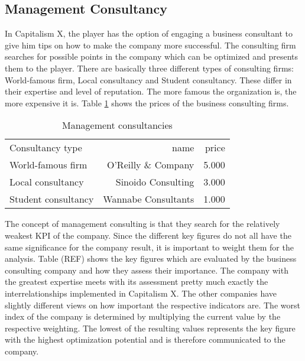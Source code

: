 \subsection{Management Consultancy} \label{management_consultancy_simulation}
In Capitalism X, the player has the option of engaging a business consultant to give him tips on how to make the company more successful. 
The consulting firm searches for possible points in the company which can be optimized and presents them to the player.
There are basically three different types of consulting firms: World-famous firm, Local consultancy and Student consultancy. These differ in their expertise and level of reputation. The more famous the organization is, the more expensive it is. Table \ref{mng_consultancy} shows the prices of the business consulting firms.

\begin{table}[ht]
\centering
\begin{tabular}{|l|r|r|}
\hline
Consultancy type        & name  & price \\
World-famous firm       & O'Reilly \& Company     & 5.000     \\
Local consultancy       & Sinoido Consulting     & 3.000     \\
Student consultancy     & Wannabe Consultants    & 1.000     \\
\hline
\end{tabular}
\caption{Management consultancies}
\label{mng_consultancy}
\end{table}

The concept of management consulting is that they search for the relatively weakest KPI of the company. Since the different key figures do not all have the same significance for the company result, it is important to weight them for the analysis.
Table (REF) shows the key figures which are evaluated by the business consulting company and how they assess their importance.
The company with the greatest expertise meets with its assessment pretty much exactly the interrelationships implemented in Capitalism X. The other companies have slightly different views on how important the respective indicators are. 
The worst index of the company is determined by multiplying the current value by the respective weighting. The lowest of the resulting values represents the key figure with the highest optimization potential and is therefore communicated to the company. 
 
